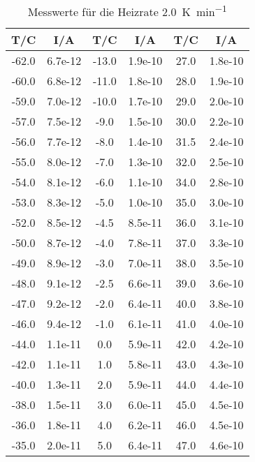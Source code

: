 \begin{table}
  \centering
  \caption{Messwerte für die Heizrate \SI{2.0}{\kelvin\per\minute}}
\begin{tabular}{cc|cc|cc}
        T/C & I/A &T/C  & I/A &T/C & I/A \\
\midrule
       -62.0 &  6.7e-12 &       -13.0 &  1.9e-10 &        27.0 &  1.8e-10 \\
       -60.0 &  6.8e-12 &       -11.0 &  1.8e-10 &        28.0 &  1.9e-10 \\
       -59.0 &  7.0e-12 &       -10.0 &  1.7e-10 &        29.0 &  2.0e-10 \\
       -57.0 &  7.5e-12 &        -9.0 &  1.5e-10 &        30.0 &  2.2e-10 \\
       -56.0 &  7.7e-12 &        -8.0 &  1.4e-10 &        31.5 &  2.4e-10 \\
       -55.0 &  8.0e-12 &        -7.0 &  1.3e-10 &        32.0 &  2.5e-10 \\
       -54.0 &  8.1e-12 &        -6.0 &  1.1e-10 &        34.0 &  2.8e-10 \\
       -53.0 &  8.3e-12 &        -5.0 &  1.0e-10 &        35.0 &  3.0e-10 \\
       -52.0 &  8.5e-12 &        -4.5 &  8.5e-11 &        36.0 &  3.1e-10 \\
       -50.0 &  8.7e-12 &        -4.0 &  7.8e-11 &        37.0 &  3.3e-10 \\
       -49.0 &  8.9e-12 &        -3.0 &  7.0e-11 &        38.0 &  3.5e-10 \\
       -48.0 &  9.1e-12 &        -2.5 &  6.6e-11 &        39.0 &  3.6e-10 \\
       -47.0 &  9.2e-12 &        -2.0 &  6.4e-11 &        40.0 &  3.8e-10 \\
       -46.0 &  9.4e-12 &        -1.0 &  6.1e-11 &        41.0 &  4.0e-10 \\
       -44.0 &  1.1e-11 &         0.0 &  5.9e-11 &        42.0 &  4.2e-10 \\
       -42.0 &  1.1e-11 &         1.0 &  5.8e-11 &        43.0 &  4.3e-10 \\
       -40.0 &  1.3e-11 &         2.0 &  5.9e-11 &        44.0 &  4.4e-10 \\
       -38.0 &  1.5e-11 &         3.0 &  6.0e-11 &        45.0 &  4.5e-10 \\
       -36.0 &  1.8e-11 &         4.0 &  6.2e-11 &        46.0 &  4.5e-10 \\
       -35.0 &  2.0e-11 &         5.0 &  6.4e-11 &        47.0 &  4.6e-10 \\

\end{tabular}
\end{table}
